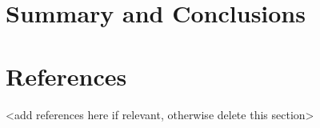 \documentclass[
  12pt,
]{article}
\begin{document}
\newpage

\hypertarget{summary-and-conclusions}{%
\section{Summary and Conclusions}\label{summary-and-conclusions}}

\newpage

\hypertarget{references}{%
\section{References}\label{references}}

\textless add references here if relevant, otherwise delete this
section\textgreater{}
\end{document}
